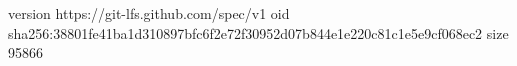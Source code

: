 version https://git-lfs.github.com/spec/v1
oid sha256:38801fe41ba1d310897bfc6f2e72f30952d07b844e1e220c81c1e5e9cf068ec2
size 95866
